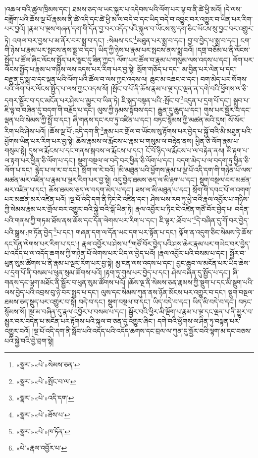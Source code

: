 །འཆལ་བའི་ཚུལ་ཁྲིམས་དང་། ཐམས་ཅད་ལ་ཡང་སྐུར་པ་འདེབས་པའི་ལོག་པར་ལྟ་བ་ནི་ཚེ་ཕྱི་མའོ། །དེ་ལས་བཟློག་པའི་ཆོས་ལྔ་པོ་རྣམས་ནི་ཚེ་འདི་དང་ཚེ་ཕྱི་མ་ལ་བདེ་བ་དང་ཡིད་བདེ་བ་འབྱུང་བར་འགྱུར་བ་ཡིན་པར་རིག་པར་བྱའོ། །རྣམ་པ་ལྔས་གཞན་དག་གི་དོན་བྱ་བར་འདོད་པའི་སྐུལ་བ་ཡོངས་སུ་དག་ཅིང་ཡོངས་སུ་བྱང་བར་འགྱུར་ཏེ། འགལ་བར་བྱས་པ་མ་ནོར་བར་སྨྲ་བ་དང་། :སེམས་དང་\footnote{«སྣར་»«པེ་»སེམས་ཅན་}མཐུན་པར་སྨྲ་བ་དང་། བྱ་བ་བྱེད་པ་སྨྲ་བ་དང་། ངག་གི་ཉེས་པ་རྣམ་པར་སྤངས་ནས་སྨྲ་བ་དང་། ཡིད་ཀྱི་ཉེས་པ་རྣམ་པར་སྤངས་ནས་སྨྲ་བའོ། །དགྲ་བཅོམ་པ་ནི་ལོངས་སྤྱོད་པ་ཚོལ་ཞིང་ལོངས་སྤྱོད་པར་སྣང་དུ་ཟིན་ཀྱང་། ལོག་པར་ཚོལ་བ་རྣམ་པ་གསུམ་ལས་འདས་པ་དང་། ལོག་པར་ལོངས་སྤྱོད་པ་རྣམ་པ་གཉིས་ལས་འདས་པར་རིག་པར་བྱ་སྟེ། སྲོག་གཅོད་པ་དང་། མ་བྱིན་པར་ལེན་པ་དང་། བརྫུན་དུ་སྨྲ་བ་དང་ལྡན་པའི་ལོག་པའི་ཚོལ་བ་ལས་ཀྱང་འདས་ལ། ཆུང་མ་འཆང་བ་དང་། བག་མེད་པར་སོགས་པའི་ལོག་པར་ལོངས་སྤྱོད་པ་ལས་ཀྱང་འདས་སོ། །སྤོང་བ་པོ་ནི་ཆོས་རྣམ་པ་ལྔ་དང་ལྡན་ན་དགེ་བའི་ཕྱོགས་ལ་ཅི་དགར་སྦྱོར་བ་དང་མངོན་པར་ཤེས་པ་མྱུར་བ་ཡིན་ཏེ། ཇི་སྐད་བསྟན་པའི་:སྤོང་བ་\footnote{«སྣར་»«པེ་»སྤོང་བ་ལ་}འདུན་པ་དྲག་པོ་དང་། སྒྲུབ་པ་ཇི་ལྟ་བ་བཞིན་དུ་བདག་གི་བརྗོད་པ་དང་། ལུས་ཀྱི་ཉམས་སྟོབས་དང་། རྒྱུན་དུ་ཆུད་པ་དང་། གུས་པར་སྦྱོར་བ་དང་ལྡན་པའི་སེམས་ཀྱི་སྤྲོ་བ་དང་། ཞི་གནས་དང་རབ་ཏུ་འཛིན་པ་དང་། བཏང་སྙོམས་ཀྱི་མཚན་མའི་དུས། སོ་སོར་རིག་པའི་ཤེས་པའོ། །ཆོས་ལྔ་པོ་:འདི་དག་ནི་\footnote{«སྣར་»«པེ་»འདི་དག་}རྣམ་པར་གྲོལ་བ་ཡོངས་སུ་རྟོགས་པར་བྱེད་པ་སྐྱོ་བའི་མི་མཐུན་པའི་ཕྱོགས་ཡིན་པར་རིག་པར་བྱ་སྟེ། ཆོས་རྣམས་ལ་རྨོངས་པ་རྣམ་པ་གསུམ་ལ་བརྟེན་ནས། ཕྱིན་ཅི་ལོག་རྣམ་པ་གསུམ་སྟེ། དུས་ལ་རྨོངས་པ་དང་གནས་སྐབས་ལ་རྨོངས་པ་དང་། ངོ་བོ་ཉིད་ལ་རྨོངས་པ་ལ་བརྟེན་ནས། མི་རྟག་པ་ལ་རྟག་པར་ཕྱིན་ཅི་ལོག་པ་དང་། སྡུག་བསྔལ་ལ་བདེ་བར་ཕྱིན་ཅི་ལོག་པ་དང་། བདག་མེད་པ་ལ་བདག་ཏུ་ཕྱིན་ཅི་ལོག་པ་དང་། རྙེད་པ་ལ་ར་བ་དང་། སྲོག་ལ་རེ་བའོ། །མི་མཐུན་པའི་ཕྱོགས་རྣམ་པ་ལྔ་པོ་འདི་དག་གི་གཉེན་པོ་ལས་མཚན་མར་འཛིན་པ་རྣམ་པ་ལྔར་རིག་པར་བྱ་སྟེ། འདུ་བྱེད་ཐམས་ཅད་ལ་མི་རྟག་པ་དང་། སྡུག་བསྔལ་བར་མཚན་མར་འཛིན་པ་དང་། ཆོས་ཐམས་ཅད་ལ་བདག་མེད་པ་དང་། ཟས་ལ་མི་མཐུན་པ་དང་། སྲོག་གི་དབང་པོ་ལ་འགག་པར་མཚན་མར་འཛིན་པའོ། །ལྔ་པོ་འདི་དག་ནི་ཏིང་ངེ་འཛིན་དང་། ཤེས་པས་རབ་ཏུ་ཕྱེ་བའི་རྣལ་འབྱོར་པ་གཉིས་ཀྱི་སེམས་རྣམ་པར་གྲོལ་བར་འགྱུར་བའི་སྐྱེ་བའི་སྒོ་ཡིན་ཏེ། རྣལ་འབྱོར་པ་ཏིང་ངེ་འཛིན་གཙོ་བོར་བྱེད་པ། བདེན་པའི་གནས་ཀྱི་གཏམ་ཐོས་ནས་ཆོས་དང་དོན་ལེགས་པར་རིག་པ་དང་། ཇི་ལྟར་:ཐོབ་པ་\footnote{«སྣར་»«པེ་»ཐོས་པ་}དེ་བཞིན་དུ་གོ་བར་བྱེད་པའི་སྒྲས་:ཁ་ཏོན་བྱེད་\footnote{«སྣར་»«པེ་»ཁ་ཏོན་}པ་དང་། གཞན་དག་ལ་དོན་ཡང་དག་པར་སྟོན་པ་དང་། ལྐོག་ན་འདུག་ཅིང་སེམས་ཏེ་ཆོས་དང་དོན་ལེགས་པར་རིག་པ་དང་:། རྣལ་འབྱོར་པ་ཤེས་པ་\footnote{«པེ་»རྣལ་འབྱོར་པ་}གཙོ་བོར་བྱེད་པའི་ཤས་ཆེར་རྣམ་པར་གཡེང་བར་བྱེད་པ་འདོད་པ་ལ་འདོད་ཆགས་ཀྱི་གཉེན་པོ་ལེགས་པར་ཡིད་ལ་བྱེད་པའོ། །རྣལ་འབྱོར་པའི་བསམ་པ་དང་། སྦྱོར་བ་ཕུན་སུམ་ཚོགས་པ་ནི་རྣམ་པ་ལྔར་རིག་པར་བྱ་སྟེ། མྱ་ངན་ལས་འདས་པ་དང་། བྱང་ཆུབ་ལ་མངོན་པར་ཡིད་ཆེས་པ་དྲག་པོ་ནི་བསམ་པ་ཕུན་སུམ་ཚོགས་པའོ། །རྟག་ཏུ་གུས་པར་བྱེད་པ་དང་། ཤེས་བཞིན་དུ་སྤྱོད་པ་དང་། ཞི་གནས་དང་ལྷག་མཐོང་ནི་སྦྱོར་བ་ཕུན་སུམ་ཚོགས་པའོ། །ཆོས་ལྔ་ནི་སེམས་ཅན་རྣམས་ཀྱི་སྡུག་པ་དང་མི་སྡུག་པའི་ལས་བྱེད་པའི་འབྲས་བུ་ཉེ་བར་སྤྱད་པ་དང་། ལུས་དང་སེམས་ཀུན་ནས་ཉོན་མོངས་པར་འགྱུར་བ་དང་། སྡུག་བསྔལ་ཐམས་ཅད་སྡུད་པར་འགྱུར་བ་སྟེ། བདེ་བ་དང་། སྡུག་བསྔལ་བ་དང་། ཡིད་བདེ་བ་དང་། ཡིད་མི་བདེ་བ་དང་། བཏང་སྙོམས་སོ། །སྔ་མ་བཞིན་དུ་རྣལ་འབྱོར་པ་བསམ་པ་དང་། སྦྱོར་བའི་ཕྱིར་མི་ལྡོག་པ་རྣམ་པ་ལྔ་དང་ལྡན་པ་ནི་མྱུར་བ་མྱུར་བར་བདེན་པ་མངོན་པར་རྟོགས་པའི་སྐལ་བ་ཅན་དུ་འགྱུར་ཞིང་། དགེ་བའི་ཕྱོགས་ལ་ཤིན་ཏུ་བསྟན་པར་འགྱུར་བའོ། །ལྔ་པོ་འདི་དག་ནི་སློབ་པའི་འདོད་པའི་འདོད་ཆགས་དང་བྲལ་ལ་ཀུན་དུ་སྦྱོར་བའི་ལྷག་མ་དང་བཅས་པའི་སྐྱེ་བའི་བྱེ་བྲག་སྟེ། 